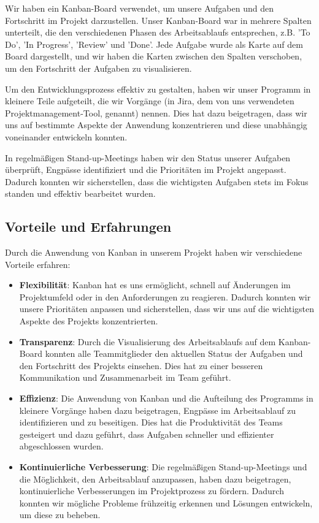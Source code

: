 \documentclass[a4paper]{article}
\begin{document}
Wir haben ein Kanban-Board verwendet, um unsere Aufgaben und den Fortschritt im Projekt darzustellen. Unser Kanban-Board war in mehrere Spalten unterteilt, die den verschiedenen Phasen des Arbeitsablaufs entsprechen, z.B. 'To Do', 'In Progress', 'Review' und 'Done'. Jede Aufgabe wurde als Karte auf dem Board dargestellt, und wir haben die Karten zwischen den Spalten verschoben, um den Fortschritt der Aufgaben zu visualisieren.

Um den Entwicklungsprozess effektiv zu gestalten, haben wir unser Programm in kleinere Teile aufgeteilt, die wir Vorgänge (in Jira, dem von uns verwendeten Projektmanagement-Tool, genannt) nennen. Dies hat dazu beigetragen, dass wir uns auf bestimmte Aspekte der Anwendung konzentrieren und diese unabhängig voneinander entwickeln konnten.

In regelmäßigen Stand-up-Meetings haben wir den Status unserer Aufgaben überprüft, Engpässe identifiziert und die Prioritäten im Projekt angepasst. Dadurch konnten wir sicherstellen, dass die wichtigsten Aufgaben stets im Fokus standen und effektiv bearbeitet wurden.

\subsection{Vorteile und Erfahrungen}

Durch die Anwendung von Kanban in unserem Projekt haben wir verschiedene Vorteile erfahren:

\begin{itemize}
\item \textbf{Flexibilität}: Kanban hat es uns ermöglicht, schnell auf Änderungen im Projektumfeld oder in den Anforderungen zu reagieren. Dadurch konnten wir unsere Prioritäten anpassen und sicherstellen, dass wir uns auf die wichtigsten Aspekte des Projekts konzentrierten.
\item \textbf{Transparenz}: Durch die Visualisierung des Arbeitsablaufs auf dem Kanban-Board konnten alle Teammitglieder den aktuellen Status der Aufgaben und den Fortschritt des Projekts einsehen. Dies hat zu einer besseren Kommunikation und Zusammenarbeit im Team geführt.
\item \textbf{Effizienz}: Die Anwendung von Kanban und die Aufteilung des Programms in kleinere Vorgänge haben dazu beigetragen, Engpässe im Arbeitsablauf zu identifizieren und zu beseitigen. Dies hat die Produktivität des Teams gesteigert und dazu geführt, dass Aufgaben schneller und effizienter abgeschlossen wurden.
\item \textbf{Kontinuierliche Verbesserung}: Die regelmäßigen Stand-up-Meetings und die Möglichkeit, den Arbeitsablauf anzupassen, haben dazu beigetragen, kontinuierliche Verbesserungen im Projektprozess zu fördern. Dadurch konnten wir mögliche Probleme frühzeitig erkennen und Lösungen entwickeln, um diese zu beheben.
\end{itemize}
\end{document}

